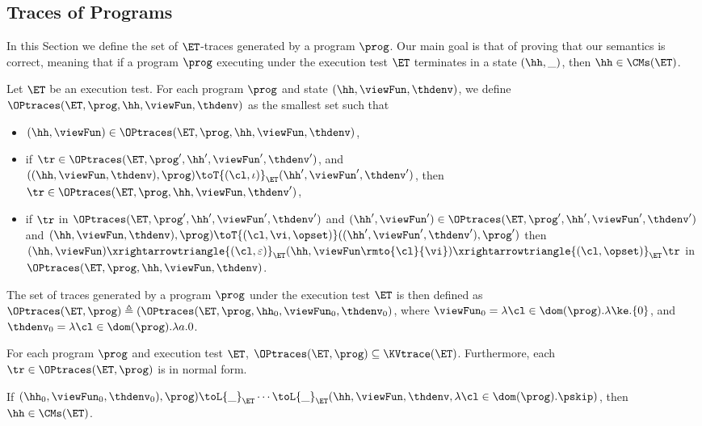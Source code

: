 \subsection{Traces of Programs}
In this Section we define the set of $\ET$-traces generated by a program 
$\prog$. Our main goal is that of proving that our semantics is correct, 
meaning that if a program $\prog$ executing under the execution 
test $\ET$ terminates in a state $(\hh, \_)$, then $\hh \in \CMs(\ET)$. 

\begin{definition}
Let $\ET$ be an execution test. For each program $\prog$ and state 
$(\hh, \viewFun, \thdenv)$, we define $\OPtraces(\ET, \prog, \hh, \viewFun, \thdenv)$ 
as the smallest set such that 
\begin{itemize}
\item $(\hh, \viewFun) \in \OPtraces(\ET, \prog, \hh, \viewFun, \thdenv)$, 
\item if $\tr \in \OPtraces(\ET, \prog', \hh', \viewFun',\thdenv')$, 
and $((\hh, \viewFun, \thdenv) , \prog) \toT{(\cl, \iota)}_{\ET} (\hh', \viewFun', \thdenv')$, 
then $\tr \in \OPtraces(\ET, \prog, \hh, \viewFun, \thdenv')$, 
\item if $\tr$ in $\OPtraces(\ET, \prog', \hh', \viewFun', \thdenv')$ and 
$(\hh', \viewFun') \in \OPtraces(\ET, \prog', \hh', \viewFun', \thdenv')$ 
and $(\hh, \viewFun, \thdenv), \prog) \toT{(\cl, \vi, \opset)} ((\hh', \viewFun', \thdenv'), \prog')$ 
then $(\hh, \viewFun) \xrightarrowtriangle{(\cl, \varepsilon)}_{\ET} (\hh, \viewFun\rmto{\cl}{\vi}) 
\xrightarrowtriangle{(\cl, \opset)}_{\ET} \tr$ in $\OPtraces(\ET, \prog, \hh, \viewFun, \thdenv)$. 
\end{itemize}

The set of traces generated by a program $\prog$ under the execution test $\ET$ is 
then defined as $\OPtraces(\ET, \prog) \triangleq (\OPtraces(\ET, \prog, \hh_{0}, \viewFun_{0}, 
\thdenv_{0})$, where $\viewFun_{0} = \lambda \cl \in \dom(\prog).\lambda \ke.\{0\}$, and 
$\thdenv_{0} = \lambda \cl \in \dom(\prog).\lambda a.0$.

\end{definition}

\begin{proposition}
For each program $\prog$ and execution test $\ET$, 
$\OPtraces(\ET, \prog) \subseteq \KVtrace(\ET)$. 
Furthermore, each $\tr \in \OPtraces(\ET, \prog)$ is in normal form. 
\end{proposition}

\begin{corollary}
If $(\hh_{0}, \viewFun_{0}, \thdenv_{0}), \prog) \toL{\_}_{\ET} \cdots \toL{\_}_{\ET} 
(\hh, \viewFun, \thdenv, \lambda \cl \in \dom(\prog). \pskip)$, then $\hh \in \CMs(\ET)$.
\end{corollary}